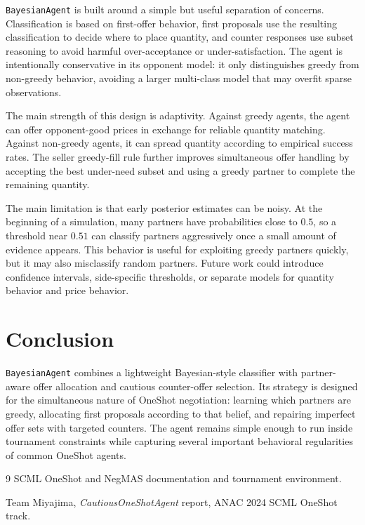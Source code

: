 \documentclass[11pt]{article}
\begin{document}
\texttt{BayesianAgent} is built around a simple but useful separation of
concerns.  Classification is based on first-offer behavior, first proposals use
the resulting classification to decide where to place quantity, and counter
responses use subset reasoning to avoid harmful over-acceptance or
under-satisfaction.  The agent is intentionally conservative in its opponent
model: it only distinguishes greedy from non-greedy behavior, avoiding a larger
multi-class model that may overfit sparse observations.

The main strength of this design is adaptivity.  Against greedy agents, the
agent can offer opponent-good prices in exchange for reliable quantity
matching.  Against non-greedy agents, it can spread quantity according to
empirical success rates.  The seller greedy-fill rule further improves
simultaneous offer handling by accepting the best under-need subset and using a
greedy partner to complete the remaining quantity.

The main limitation is that early posterior estimates can be noisy.  At the
beginning of a simulation, many partners have probabilities close to \(0.5\),
so a threshold near \(0.51\) can classify partners aggressively once a small
amount of evidence appears.  This behavior is useful for exploiting greedy
partners quickly, but it may also misclassify random partners.  Future work
could introduce confidence intervals, side-specific thresholds, or separate
models for quantity behavior and price behavior.

\section{Conclusion}

\texttt{BayesianAgent} combines a lightweight Bayesian-style classifier with
partner-aware offer allocation and cautious counter-offer selection.  Its
strategy is designed for the simultaneous nature of OneShot negotiation:
learning which partners are greedy, allocating first proposals according to
that belief, and repairing imperfect offer sets with targeted counters.  The
agent remains simple enough to run inside tournament constraints while
capturing several important behavioral regularities of common OneShot agents.

\begin{thebibliography}{9}
SCML OneShot and NegMAS documentation and tournament environment.

Team Miyajima, \emph{CautiousOneShotAgent} report, ANAC 2024 SCML OneShot
track.
\end{thebibliography}
\end{document}
